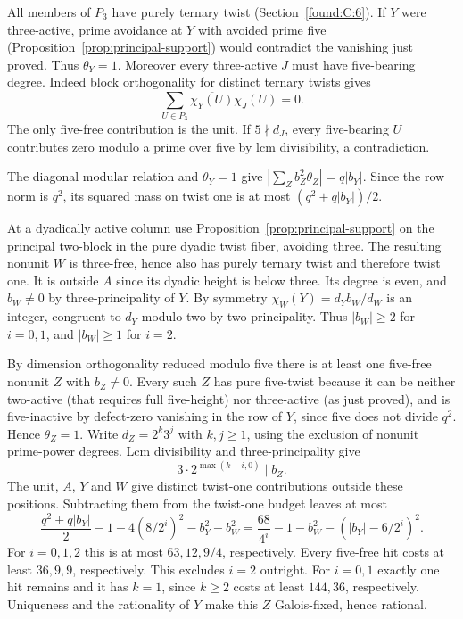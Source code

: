 \documentclass[11pt,a4paper]{article}
\numberwithin{equation}{section}
\theoremstyle{remark}
\begin{document}
All members of $P_3$ have purely ternary twist (Section~\ref{found:C:6}). If $Y$ were three-active, prime avoidance at $Y$ with avoided prime five (Proposition~\ref{prop:principal-support}) would contradict the vanishing just proved. Thus $\theta_Y=1$. Moreover every three-active $J$ must have five-bearing degree. Indeed block orthogonality for distinct ternary twists gives
\[
          \sum_{U\in P_3}\overline{\chi_Y(U)}\chi_J(U)=0.
\]
The only five-free contribution is the unit. If $5\nmid d_J$, every five-bearing $U$ contributes zero modulo a prime over five by lcm divisibility, a contradiction.

The diagonal modular relation and $\theta_Y=1$ give $|\sum_Z b_Z^2\theta_Z|=q|b_Y|$. Since the row norm is $q^2$, its squared mass on twist one is at most $(q^2+q|b_Y|)/2$.

At a dyadically active column use Proposition~\ref{prop:principal-support} on the principal two-block in the pure dyadic twist fiber, avoiding three. The resulting nonunit $W$ is three-free, hence also has purely ternary twist and therefore twist one. It is outside $A$ since its dyadic height is below three. Its degree is even, and $b_W\ne0$ by three-principality of $Y$. By symmetry $\chi_W(Y)=d_Yb_W/d_W$ is an integer, congruent to $d_Y$ modulo two by two-principality. Thus $|b_W|\ge2$ for $i=0,1$, and $|b_W|\ge1$ for $i=2$.

By dimension orthogonality reduced modulo five there is at least one five-free nonunit $Z$ with $b_Z\ne0$. Every such $Z$ has pure five-twist because it can be neither two-active (that requires full five-height) nor three-active (as just proved), and is five-inactive by defect-zero vanishing in the row of $Y$, since five does not divide $q^2$. Hence $\theta_Z=1$. Write $d_Z=2^k3^j$ with $k,j\ge1$, using the exclusion of nonunit prime-power degrees. Lcm divisibility and three-principality give
\[
          3\cdot 2^{\max(k-i,0)}\mid b_Z .
\]
The unit, $A$, $Y$ and $W$ give distinct twist-one contributions
outside these positions. Subtracting them from the twist-one budget
leaves at most
\[
 \frac{q^2+q|b_Y|}{2}-1-4(8/2^i)^2-b_Y^2-b_W^2
 =\frac{68}{4^i}-1-b_W^2-(|b_Y|-6/2^i)^2 .
\]
For $i=0,1,2$ this is at most $63,12,9/4$, respectively. Every
five-free hit costs at least $36,9,9$, respectively. This excludes
$i=2$ outright. For $i=0,1$ exactly one hit remains and it has
$k=1$, since $k\ge2$ costs at least $144,36$, respectively.
Uniqueness and the rationality of $Y$ make this $Z$ Galois-fixed, hence rational.
\end{document}
